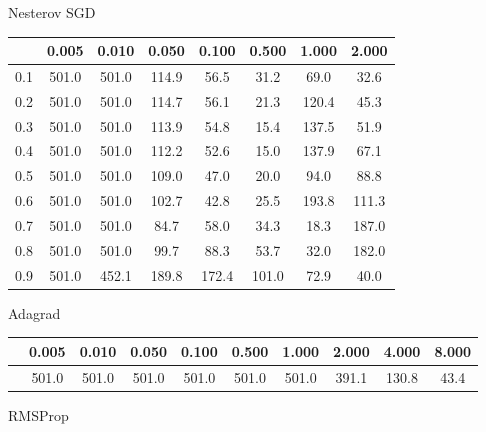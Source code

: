 \documentclass[a4paper,14pt,oneside,openany]{memoir}
\begin{document}
	Nesterov SGD 
	
	\begin{tabular}{|c|c|c|c|c|c|c|c|}
	\hline 
	 &0.005 &0.010 &0.050 &0.100 &0.500 &1.000 &2.000 \\
	 \hline 
	0.1 &501.0 &501.0 &114.9 &56.5 &31.2 &69.0 &32.6 \\
	 \hline 
	0.2 &501.0 &501.0 &114.7 &56.1 &21.3 &120.4 &45.3 \\
	 \hline 
	0.3 &501.0 &501.0 &113.9 &54.8 &15.4 &137.5 &51.9 \\
	 \hline 
	0.4 &501.0 &501.0 &112.2 &52.6 &15.0 &137.9 &67.1 \\
	 \hline 
	0.5 &501.0 &501.0 &109.0 &47.0 &20.0 &94.0 &88.8 \\
	 \hline 
	0.6 &501.0 &501.0 &102.7 &42.8 &25.5 &193.8 &111.3 \\
	 \hline 
	0.7 &501.0 &501.0 &84.7 &58.0 &34.3 &18.3 &187.0 \\
	 \hline 
	0.8 &501.0 &501.0 &99.7 &88.3 &53.7 &32.0 &182.0 \\
	 \hline 
	0.9 &501.0 &452.1 &189.8 &172.4 &101.0 &72.9 &40.0 \\
	 \hline 
	
	\end{tabular}
	
	Adagrad 
	
	\begin{tabular}{|c|c|c|c|c|c|c|c|c|c|}
	\hline 
	 &0.005 &0.010 &0.050 &0.100 &0.500 &1.000 &2.000 &4.000 &8.000 \\
	 \hline 
	 &501.0 &501.0 &501.0 &501.0 &501.0 &501.0 &391.1 &130.8 &43.4 \\
	 \hline 
	
	\end{tabular}
	
	RMSProp 
	
\end{document}
